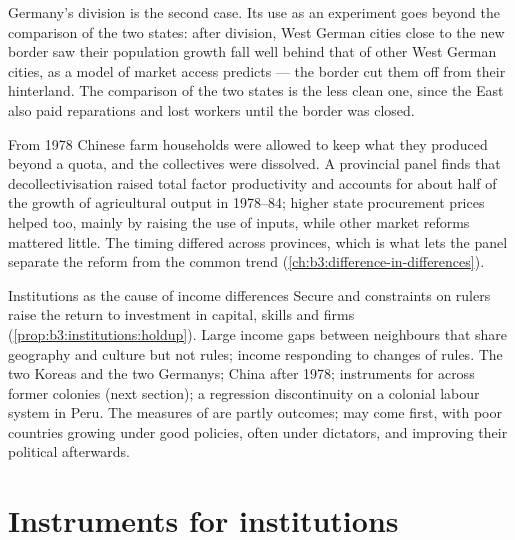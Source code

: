 Germany's division is the second case. Its use as an experiment goes beyond the
comparison of the two states: after division, West German cities close to the new
border saw their population growth fall well behind that of other West German
cities, as a model of market access predicts --- the border cut them off from their
hinterland. %
The comparison of the two states is the less clean one, since the East also paid
reparations and lost workers until the border was closed.

\begin{record}
From 1978 Chinese farm households were allowed to keep what they produced beyond a
quota, and the collectives were dissolved. A provincial panel finds that
decollectivisation raised total factor productivity and accounts for about half of
the growth of agricultural output in 1978--84; higher state procurement prices helped too,
mainly by raising the use of inputs, while other market reforms mattered little. %
The timing differed across provinces, which is what lets the panel separate the
reform from the common trend (\cref{ch:b3:difference-in-differences}).
\end{record}

\begin{model}{Institutions as the cause of income differences}
\assumes Secure  and constraints on rulers raise the return to
investment in capital, skills and firms
(\cref{prop:b3:institutions:holdup}).
\predicts Large income gaps between neighbours that share geography and culture but
not rules; income responding to changes of rules.
\tested The two Koreas and the two Germanys; China after 1978; instruments for
 across former colonies (next section); a regression discontinuity on
a colonial labour system in Peru. %
\breaks The measures of  are partly outcomes;  may come
first, with poor countries growing under good policies, often under dictators, and
improving their political  afterwards. %
\end{model}

\section{Instruments for institutions}\label{sec:b3:institutions:instruments}

